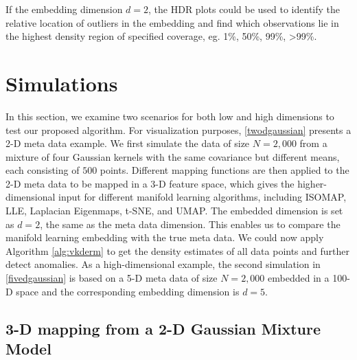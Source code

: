 \documentclass[11pt,a4paper,]{article}
\begin{document}
If the embedding dimension \(d=2\), the HDR plots \autocite{Hyndman1996-lk} could
be used to identify the relative location of outliers in the embedding
and find which observations lie in the highest density region of
specified coverage, eg. 1\%, 50\%, 99\%, \textgreater99\%.

\hypertarget{simulation}{%
\section{Simulations}\label{simulation}}

In this section, we examine two scenarios for both low and high
dimensions to test our proposed algorithm. For visualization purposes,
\autoref{twodgaussian} presents a 2-D meta data example. We first
simulate the data of size \(N=2,000\) from a mixture of four Gaussian
kernels with the same covariance but different means, each consisting of
\(500\) points. Different mapping functions are then applied to the 2-D
meta data to be mapped in a 3-D feature space, which gives the
higher-dimensional input for different manifold learning algorithms,
including ISOMAP, LLE, Laplacian Eigenmaps, t-SNE, and UMAP. The
embedded dimension is set as \(d=2\), the same as the meta data dimension.
This enables us to compare the manifold learning embedding with the true
meta data. We could now apply Algorithm \ref{alg:vkderm} to get the
density estimates of all data points and further detect anomalies. As a
high-dimensional example, the second simulation in
\autoref{fivedgaussian} is based on a 5-D meta data of size \(N=2,000\)
embedded in a 100-D space and the corresponding embedding dimension is
\(d=5\).

\hypertarget{twodgaussian}{%
\subsection{3-D mapping from a 2-D Gaussian Mixture Model}\label{twodgaussian}}
\end{document}
